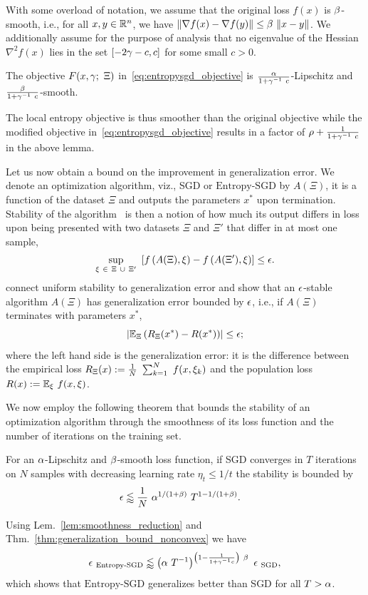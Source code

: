 \documentclass[10pt]{article}
\newcommand{\entropysgd}{\mathrm{Entropy}\textrm{-}\mathrm{SGD}}
\begin{document}
With some overload of notation, we assume that the original loss $f(x)$ is $\beta$-smooth, i.e., for all $x,y \in \mathbb{R}^n$, we have $\lVert\nabla f(x) - \nabla f(y)\rVert \leq \beta\ \lVert x-y\rVert$. We additionally assume for the purpose of analysis that no eigenvalue of the Hessian $\nabla^2 f(x)$ lies in the set $[-2 \gamma-c, c]$ for some small $c > 0$.
%
\begin{lemma}
\label{lem:smoothness_reduction}
The objective $F(x, \gamma;\ \Xi)$ in~\eqref{eq:entropysgd_objective} is $\frac{\alpha}{1 + \gamma^{-1}\ c}$-Lipschitz and $\frac{\beta}{1 + \gamma^{-1}\ c}$-smooth.
\end{lemma}
The local entropy objective is thus smoother than the original objective while the modified objective in~\eqref{eq:entropysgd_objective} results in a factor of $\rho + \frac{1}{1 + \gamma^{-1}\ c}$ in the above lemma.

Let us now obtain a bound on the improvement in generalization error. We denote an optimization algorithm, viz., SGD or $\entropysgd$ by $A(\Xi)$, it is a function of the dataset $\Xi$ and outputs the parameters $x^*$ upon termination. Stability of the algorithm~\citep{bousquet2002stability} is then a notion of how much its output differs in loss upon being presented with two datasets $\Xi$ and $\Xi'$ that differ in at most one sample,
$$
    \sup_{\xi\ \in\ \Xi\ \cup\ \Xi'}\ \left[ f \left(A(\Xi), \xi\right) - f \left(A(\Xi'), \xi\right)\right] \leq \epsilon.
$$
\citet{hardt2015train} connect uniform stability to generalization error and show that an $\epsilon$-stable algorithm $A(\Xi)$ has generalization error bounded by $\epsilon$, i.e., if $A(\Xi)$ terminates with parameters $x^*$,
$$
    \left|  \mathbb{E}_{\Xi} \left(R_\Xi(x^*) - R(x^*)\right)  \right| \leq \epsilon;
$$
where the left hand side is the generalization error: it is the difference between the empirical loss $R_\Xi(x) := \frac{1}{N}\ \sum_{k=1}^N\ f(x, \xi_k)$ and the population loss $R(x) := \mathbb{E}_{\xi}\ f(x, \xi)$.

We now employ the following theorem that bounds the stability of an optimization algorithm through the smoothness of its loss function and the number of iterations on the training set.
\begin{theorem}
\label{thm:generalization_bound_nonconvex}
For an $\alpha$-Lipschitz and $\beta$-smooth loss function, if SGD converges in $T$ iterations on $N$ samples with decreasing learning rate $\eta_t \leq 1/t$ the stability is bounded by
\begin{align*}
    \epsilon
    &\lessapprox \frac{1}{N}\ \alpha^{1/(1 + \beta)}\ T^{1 - 1/(1 + \beta)}.
\end{align*}
\end{theorem}
%
Using Lem.~\ref{lem:smoothness_reduction} and Thm.~\ref{thm:generalization_bound_nonconvex} we have
\begin{equation}
    \e_{\ \entropysgd} \lessapprox \rbrac{\a\ T^{-1}}^{\rbrac{1 - \f{1}{1 + \g^{-1}c}}\ \b}\ \e_{\ \textrm{SGD}},
    \label{eq:stability_bound}
\end{equation}
which shows that $\entropysgd$ generalizes better than SGD for all $T > \alpha$.
\end{document}

